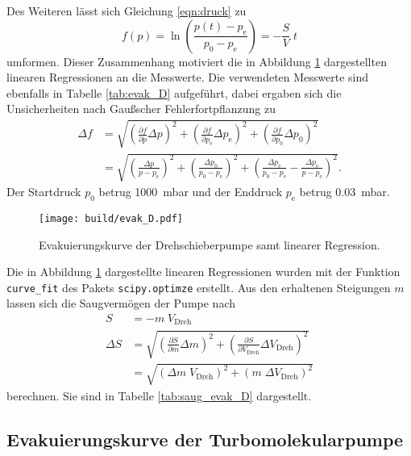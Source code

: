 Des Weiteren lässt sich Gleichung \eqref{eqn:druck} zu
\begin{equation*}
  f\left(p\right) = \ln\left(\frac{p(t)-p_\text{e}}{p_0-p_\text{e}}\right) =
  - \frac{S}{V} \;t
\end{equation*}
umformen. Dieser Zusammenhang motiviert die in Abbildung \ref{fig:evak_D}
dargestellten linearen Regressionen an die Messwerte. Die verwendeten Messwerte
sind ebenfalls in Tabelle \ref{tab:evak_D} aufgeführt, dabei ergaben sich die
Unsicherheiten nach Gaußscher Fehlerfortpflanzung zu
\begin{align*}
  \Delta f &=
  \sqrt{\left(\frac{\partial f}{\partial p} \Delta p\right)^2 +
  \left(\frac{\partial f}{\partial p_\text{e}} \Delta p_\text{e}\right)^2 +
  \left(\frac{\partial f}{\partial p_\text{0}} \Delta p_\text{0}\right)^2} \\
  &=
  \sqrt{\left(\frac{\Delta p}{p - p_\text{e}}\right)^2 +
  \left(\frac{\Delta p_0}{p_0 - p_\text{e}}\right)^2 +
  \left(\frac{\Delta p_\text{e}}{p_0 - p_\text{e}} -
  \frac{\Delta p_\text{e}}{p - p_\text{e}}\right)^2}.
\end{align*}
Der Startdruck $p_0$ betrug \SI{1000}{\milli\bar} und der Enddruck $p_\text{e}$
betrug \SI{0.03}{\milli\bar}.

\begin{figure}
  \centering
  \texttt{[image: build/evak\_D.pdf]}
  \caption{Evakuierungskurve der Drehschieberpumpe samt linearer Regression.}
  \label{fig:evak_D}
\end{figure}

Die in Abbildung \ref{fig:evak_D} dargestellte linearen Regressionen wurden
mit der Funktion \texttt{curve\_fit} des Pakets \texttt{scipy.optimze} \cite{scipy}
erstellt. Aus den erhaltenen Steigungen $m$ lassen sich die Saugvermögen der Pumpe
nach
\begin{align*}
    S &= - m \; V_\text{Dreh} \\
    \Delta S &=
    \sqrt{\left(\frac{\partial S}{\partial m} \Delta m\right)^2 +
    \left(\frac{\partial S}{\partial V_\text{Dreh}} \Delta V_\text{Dreh}\right)^2} \\
    &=
    \sqrt{\left(\Delta m \; V_\text{Dreh}\right)^2 +
    \left(m \; \Delta V_\text{Dreh}\right)^2}
\end{align*}
berechnen. Sie sind in Tabelle \ref{tab:saug_evak_D} dargestellt.


\FloatBarrier


\subsection{Evakuierungskurve der Turbomolekularpumpe}
\label{sec:AuswEvaT}

